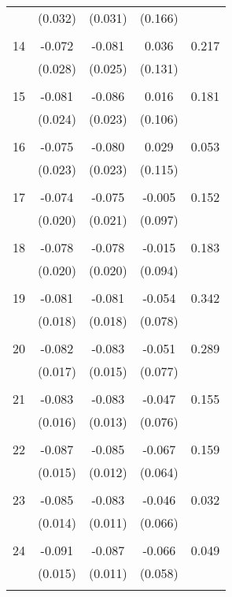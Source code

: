 \begin{tabular}{l*{1}{cccc}}
          & (0.032) & (0.031) & (0.166) & \\
 & & & &\\
  14       & -0.072 & -0.081 & 0.036 & 0.217 \\
          & (0.028) & (0.025) & (0.131) & \\
 & & & &\\
  15       & -0.081 & -0.086 & 0.016 & 0.181 \\
          & (0.024) & (0.023) & (0.106) & \\
 & & & &\\
  16       & -0.075 & -0.080 & 0.029 & 0.053 \\
          & (0.023) & (0.023) & (0.115) & \\
 & & & &\\
  17       & -0.074 & -0.075 & -0.005 & 0.152 \\
          & (0.020) & (0.021) & (0.097) & \\
 & & & &\\
  18       & -0.078 & -0.078 & -0.015 & 0.183 \\
          & (0.020) & (0.020) & (0.094) & \\
 & & & &\\
  19       & -0.081 & -0.081 & -0.054 & 0.342 \\
          & (0.018) & (0.018) & (0.078) & \\
 & & & &\\
  20       & -0.082 & -0.083 & -0.051 & 0.289 \\
          & (0.017) & (0.015) & (0.077) & \\
 & & & &\\
  21       & -0.083 & -0.083 & -0.047 & 0.155 \\
          & (0.016) & (0.013) & (0.076) & \\
 & & & &\\
  22       & -0.087 & -0.085 & -0.067 & 0.159 \\
          & (0.015) & (0.012) & (0.064) & \\
 & & & &\\
  23       & -0.085 & -0.083 & -0.046 & 0.032 \\
          & (0.014) & (0.011) & (0.066) & \\
 & & & &\\
  24       & -0.091 & -0.087 & -0.066 & 0.049 \\
          & (0.015) & (0.011) & (0.058) & \\
 & & & &\\

\end{tabular}
